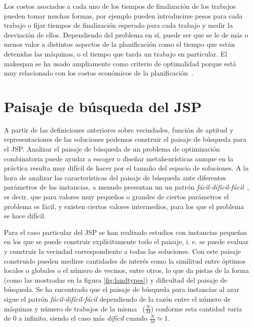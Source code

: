 Los costos asociados a cada uno de los tiempos de finalización de los trabajos pueden tomar muchas formas, por ejemplo pueden introducirse pesos para cada 
trabajo o fijar tiempos de finalización esperado para cada trabajo y medir la desviación de ellos.
%
Dependiendo del problema en sí, puede ser que se le de más o menos valor a distintos aspectos de la planificación como el tiempo que están detenidas las máquinas, 
o el tiempo que tarda un trabajo en particular. 
%
El makespan se ha usado ampliamente como criterio de optimalidad porque está muy relacionado con los costos económicos de la planificación~\cite{Rand1977}.


\section{Paisaje de búsqueda del JSP}

A partir de las definiciones anteriores sobre vecindades, función de aptitud y representaciones de las soluciones podemos construir el paisaje de búsqueda para el JSP.
%
Analizar el paisaje de búsqueda de un problema de optimización combinatoria puede ayudar a escoger o diseñar metaheurísticas aunque en la práctica resulta muy difícil
de hacer por el tamaño del espacio de soluciones. 
%
A la hora de analizar las características del paisaje de búsqueda ante diferentes parámetros de las instancias, a menudo presentan un un patrón 
\textit{fácil-difícil-fácil}~\cite{mammen1997new}, es decir, que para valores muy pequeños o grandes de ciertos parámetros el problema es fácil, y existen ciertos valores
intermedios, para los que el problema se hace difícil.

Para el caso particular del JSP se han realizado estudios con instancias pequeñas en los que se puede construir explícitamente todo el paisaje, i. e. se puede evaluar y 
construir la vecindad correspondiente a todas las soluciones. 
%
Con este paisaje construido pueden medirse cantidades de interés como la similitud entre óptimos locales o globales o el número de vecinos, entre otros, lo que da
pistas de la forma (como las mostradas en la figura \ref{fig:landtypes}) y dificultad del paisaje de búsqueda.
%
Se ha encontrado que el paisaje de búsqueda para instancias al azar sigue el patrón \textit{fácil-difícil-fácil} dependiendo de la razón entre el número de máquinas y 
número de trabajos de la misma~\cite{Streeter2006} ($\frac{N}{M}$) conforme esta cantidad  varía de 0 a infinito, siendo el caso más \textit{difícil} cuando $\frac{N}{M}\simeq 1$. 
%

